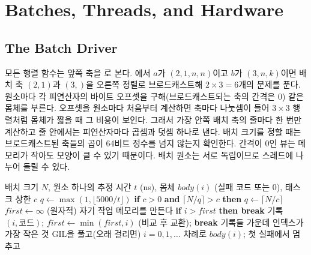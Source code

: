 \section{Batches, Threads, and Hardware}
\label{sec:lu-batches}

\subsection{The Batch Driver}

모든 행렬 함수는 앞쪽 축을 로 본다. 에서 $a$가 $(2,1,n,n)$이고 $b$가 $(3,n,k)$이면 배치 축 $(2,1)$과 $(3,)$을 오른쪽 정렬로 브로드캐스트해 $2\times3=6$개의 문제를 푼다. 원소마다 각 피연산자의 바이트 오프셋을 구해(브로드캐스트되는 축의 간격은 $0$) 같은 몸체를 부른다. 오프셋을 원소마다 처음부터 계산하면 축마다 나눗셈이 들어 $3\times3$ 행렬처럼 몸체가 짧을 때 그 비용이 보인다. 그래서 가장 안쪽 배치 축의 줄마다 한 번만 계산하고 줄 안에서는 피연산자마다 곱셈과 덧셈 하나로 낸다. 배치 크기를 정할 때는 브로드캐스트된 축들의 곱이 64비트 정수를 넘지 않는지 확인한다. 간격이 $0$인 뷰는 메모리가 작아도 모양이 클 수 있기 때문이다. 배치 원소는 서로 독립이므로 스레드에 나누어 돌릴 수 있다.

\begin{algorithm}[t]
\begin{algorithmic}[1]
\Require 배치 크기 $N$, 원소 하나의 추정 시간 $t$ (ns), 몸체 $\mathit{body}(i)$ (실패 코드 또는 $0$), 태스크 상한 $c$
  \State $q\gets\max(1,\lfloor5000/t\rfloor)$ 
  \State \textbf{if} $c>0$ \textbf{and} $\lceil N/q\rceil>c$ \textbf{then} $q\gets\lceil N/c\rceil$
  \State $\mathit{first}\gets\infty$ (원자적)
    \State 자기 작업 메모리를 만든다
      \State \textbf{if} $i>\mathit{first}$ \textbf{then break} 
        \State 기록 $(i,\text{코드})$; $\mathit{first}\gets\min(\mathit{first},i)$ (비교 후 교환); \textbf{break}
      \EndIf
    \EndFor
  \EndFor
  \State \Return 기록들 가운데 인덱스가 가장 작은 것
\Else
  \State GIL을 풀고(오래 걸리면) $i=0,1,\dots$ 차례로 $\mathit{body}(i)$; 첫 실패에서 멈추고 \Return
\EndIf
\end{algorithmic}
\caption{배치 드라이버 ()}
\label{alg:lu-batch}
\end{algorithm}

